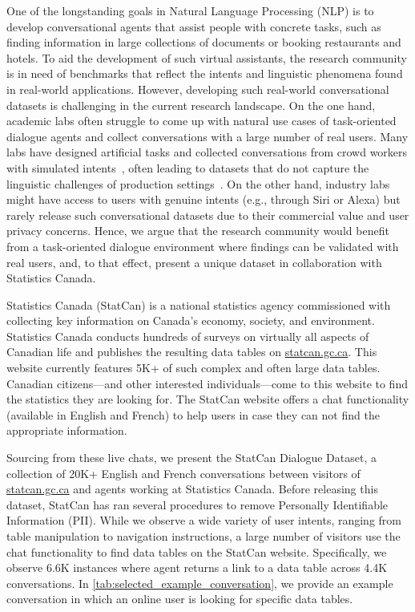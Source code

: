 \documentclass[11pt]{article}
\begin{document}
One of the longstanding goals in Natural Language Processing (NLP) is to develop conversational agents that assist people with concrete tasks, such as finding information in large collections of documents or booking restaurants and hotels. To aid the development of such virtual assistants, the research community is in need of benchmarks that reflect the intents and linguistic phenomena found in real-world applications. However, developing such real-world conversational datasets is challenging in the current research landscape. On the one hand, academic labs often struggle to come up with natural use cases of task-oriented dialogue agents and collect conversations with a large number of real users. Many labs have designed artificial tasks and collected conversations from crowd workers with simulated intents~\cite{budzianowski-etal-2018-multiwoz,adlakha_topiocqa_2022,lee2021sgd}, often leading to datasets that do not capture the linguistic challenges of production settings~\cite{de_vries_towards_2020}. On the other hand, industry labs might have access to users with genuine intents (e.g., through Siri or Alexa) but rarely release such conversational datasets due to their commercial value and user privacy concerns. Hence, we argue that the research community would benefit from a task-oriented dialogue environment where findings can be validated with real users, and, to that effect, present a unique dataset in collaboration with Statistics Canada. 

Statistics Canada (StatCan) is a national statistics agency commissioned with collecting key information on Canada's economy, society, and environment. Statistics Canada conducts hundreds of surveys on virtually all aspects of Canadian life and publishes the resulting data tables on \href{https://www.statcan.gc.ca/}{statcan.gc.ca}. This website currently features 5K+ of such complex and often large data tables.  Canadian citizens---and other interested individuals---come to this website to find the statistics they are looking for. The StatCan website offers a chat functionality (available in English and French) to help users in case they can not find the appropriate information.

Sourcing from these live chats, we present the StatCan Dialogue Dataset, a collection of 20K+ English and French conversations between visitors of \href{https://www.statcan.gc.ca/}{statcan.gc.ca} and agents working at Statistics Canada. Before releasing this dataset, StatCan has ran several procedures to remove Personally Identifiable Information (PII). While we observe a wide variety of user intents, ranging from table manipulation to navigation instructions, a large number of visitors use the chat functionality to find data tables on the StatCan website. Specifically, we observe 6.6K instances where agent returns a link to a data table across 4.4K conversations. In \autoref{tab:selected_example_conversation}, we provide an example conversation in which an online user is looking for specific data tables.  
\end{document}
